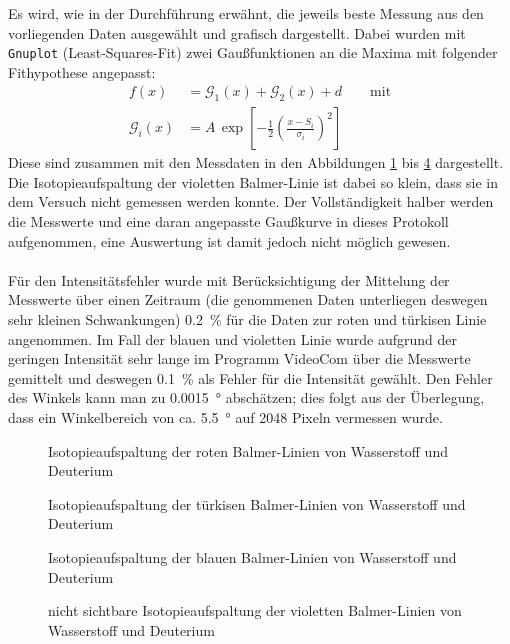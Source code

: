 \documentclass[11pt, a4paper]{article}
\numberwithin{equation}{section}
\begin{document}
Es wird, wie in der Durchführung erwähnt, die jeweils beste Messung aus den vorliegenden Daten ausgewählt und grafisch dargestellt.
Dabei wurden mit \texttt{Gnuplot} (Least-Squares-Fit) zwei Gaußfunktionen an die Maxima mit folgender Fithypothese angepasst:
\begin{align*}
f(x)&=\mathcal{G}_1(x)+\mathcal{G}_2(x) + d\qquad\text{mit}\\
\mathcal{G}_i(x)&=A\,\exp\left[-\frac{1}{2}\left(\frac{x-S_i}{\sigma_i}\right)^2\right]
\end{align*}
Diese sind zusammen mit den Messdaten in den Abbildungen \ref{fig:aufspaltung_rot} bis  \ref{fig:aufspaltung_violett} dargestellt.
Die Isotopieaufspaltung der violetten Balmer-Linie ist dabei so klein, dass sie in dem Versuch nicht gemessen werden konnte.
Der Vollständigkeit halber werden die Messwerte und eine daran angepasste Gaußkurve in dieses Protokoll aufgenommen, eine Auswertung ist damit jedoch nicht möglich gewesen.\\
\\
Für den Intensitätsfehler wurde mit Berücksichtigung der Mittelung der Messwerte über einen Zeitraum (die genommenen Daten unterliegen deswegen sehr kleinen Schwankungen) \SI{0.2}{\percent} für die Daten zur roten und türkisen Linie angenommen.
Im Fall der blauen und violetten Linie wurde aufgrund der geringen Intensität sehr lange im Programm VideoCom über die Messwerte gemittelt und deswegen \SI{0.1}{\percent} als Fehler für die Intensität gewählt.
Den Fehler des Winkels kann man zu \SI{0.0015}{\degree} abschätzen; dies folgt aus der Überlegung, dass ein Winkelbereich von ca. \SI{5.5}{\degree} auf \num{2048} Pixeln vermessen wurde.
\begin{figure}[h]
\centering

\caption{Isotopieaufspaltung der roten Balmer-Linien von Wasserstoff und Deuterium}
\label{fig:aufspaltung_rot}
\end{figure}
\begin{figure}
\centering

\caption{Isotopieaufspaltung der türkisen Balmer-Linien von Wasserstoff und Deuterium}
\label{fig:aufspaltung_tuerkis}
\end{figure}
\begin{figure}
\centering

\caption{Isotopieaufspaltung der blauen Balmer-Linien von Wasserstoff und Deuterium}
\label{fig:aufspaltung_blau}
\end{figure}
\begin{figure}[h]
\centering

\caption{nicht sichtbare Isotopieaufspaltung der violetten Balmer-Linien von Wasserstoff und Deuterium}
\label{fig:aufspaltung_violett}
\end{figure}
\end{document}
